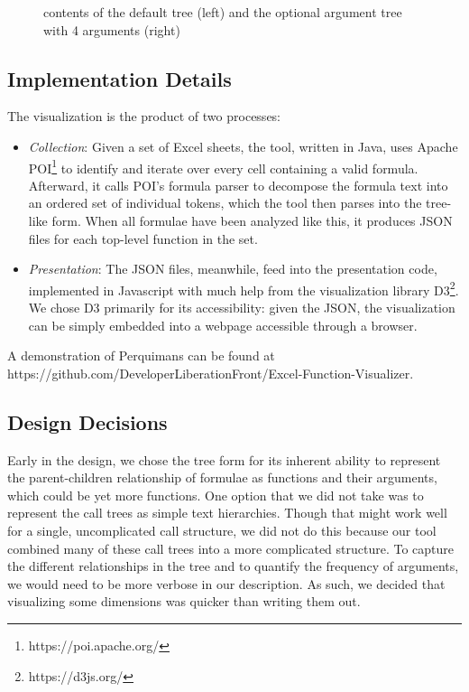 \documentclass[conference]{IEEEtran}
\newcommand{\toolname}{Perquimans\xspace} \newcommand{\toolnameend}{Perquimans}
\begin{document}
\begin{figure}[h]
{			contents of the default tree (left) and the optional argument tree with 4 arguments (right)}
		\label{fig:optional} \end{figure}
	
	
	
	\subsection{Implementation Details} The visualization is the product of two processes: \begin{itemize} \item \textit{Collection}: Given a set of
		Excel sheets, the tool, written in Java, uses Apache
		POI\footnote{https://poi.apache.org/} to identify and iterate over every cell
		containing a valid formula. Afterward, it calls POI's formula parser to decompose
		the formula text into an ordered set of individual tokens, which the tool then
		parses into the tree-like form. When all formulae have been analyzed like this,
		it produces JSON files for each top-level function in the set.
		
		\item \textit{Presentation}: The JSON files, meanwhile, feed into the
		presentation code, implemented in Javascript with much help from the
		visualization library D3\footnote{https://d3js.org/}. We chose D3 primarily
		for its accessibility: given the JSON, the visualization can be simply
		embedded into a webpage accessible through a browser. \end{itemize} A
	demonstration of \toolname can be found at
	https://github.com/DeveloperLiberationFront/Excel-Function-Visualizer.
	
	\subsection{Design Decisions} \label{ssec:decisions} Early in the design, we
	chose the tree form for its inherent ability to represent the parent-children
	relationship of formulae as functions and their arguments, which could be yet
	more functions. One option that we did not take was to represent the call trees
	as simple text hierarchies. Though that might work well for a single,
	uncomplicated call structure, we did not do this because our tool combined many
	of these call trees into a more complicated structure. To capture the different
	relationships in the tree and to quantify the frequency of arguments, we would
	need to be more verbose in our description. As such, we decided that
	visualizing some dimensions was quicker than writing them out.
	
\end{document}
